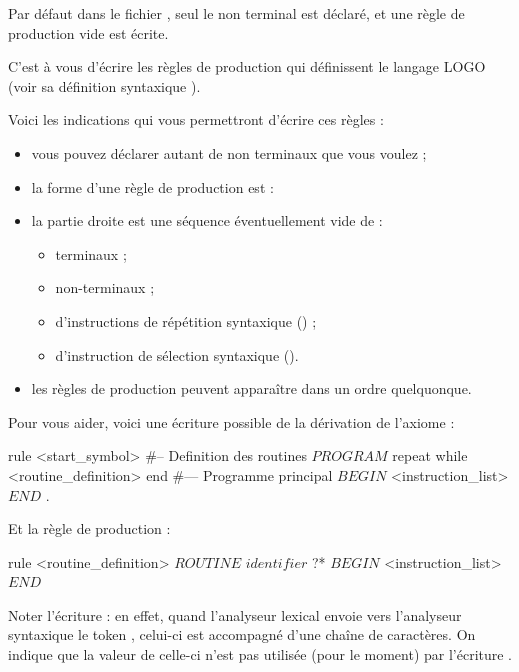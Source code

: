 Par défaut dans le fichier , seul le non terminal  est déclaré, et une règle de production vide est écrite.

C'est à vous d'écrire les règles de production qui définissent le langage LOGO (voir sa définition syntaxique ).

Voici les indications qui vous permettront d'écrire ces règles :
\begin{itemize}
  \item vous pouvez déclarer autant de non terminaux que vous voulez ;
  \item la forme d'une règle de production est : 
  \item la partie droite est une séquence éventuellement vide de :
  \begin{itemize}
    \item terminaux ;
    \item non-terminaux ;
    \item d'instructions de répétition syntaxique () ;
    \item d'instruction de sélection syntaxique ().
  \end{itemize}
  \item les règles de production peuvent apparaître dans un ordre quelquonque.
\end{itemize}

Pour vous aider, voici une écriture possible de la dérivation de l'axiome :

\begin{galgascode}
rule <start_symbol> {
#-- Definition des routines
  $PROGRAM$
  repeat
  while
    <routine_definition>
  end
#--- Programme principal
  $BEGIN$
  <instruction_list> 
  $END$
  $.$
}
\end{galgascode}

Et la règle de production  :

\begin{galgascode}
rule <routine_definition> {
  $ROUTINE$
  $identifier$ ?*
  $BEGIN$
  <instruction_list>
  $END$
}
\end{galgascode}

Noter l’écriture  : en effet, quand l’analyseur lexical envoie vers l’analyseur syntaxique le token , celui-ci est accompagné d’une chaîne de caractères. On indique que la valeur de celle-ci n’est pas utilisée (pour le moment) par l’écriture \galgas{\?*}.


